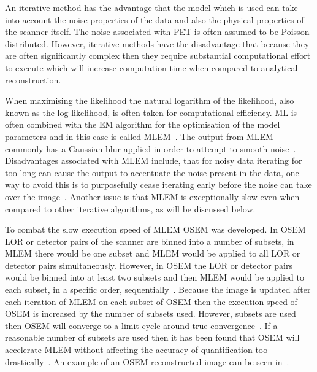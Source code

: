             An iterative method has the advantage that the model which is used can take into account the noise properties of the data and also the physical properties of the scanner itself. The noise associated with \gls{PET} is often assumed to be Poisson distributed. However, iterative methods have the disadvantage that because they are often significantly complex then they require substantial computational effort to execute which will increase computation time when compared to analytical reconstruction.
            
            When maximising the likelihood the natural logarithm of the likelihood, also known as the log-likelihood, is often taken for computational efficiency. \gls{ML} is often combined with the \gls{EM} algorithm for the optimisation of the model parameters and in this case is called \gls{MLEM}~. The output from \gls{MLEM} commonly has a Gaussian blur applied in order to attempt to smooth noise~. Disadvantages associated with \gls{MLEM} include, that for noisy data iterating for too long can cause the output to accentuate the noise present in the data, one way to avoid this is to purposefully cease iterating early before the noise can take over the image~. Another issue is that \gls{MLEM} is exceptionally slow even when compared to other iterative algorithms, as will be discussed below. %
            
            To combat the slow execution speed of \gls{MLEM} \gls{OSEM} was developed. In \gls{OSEM} \gls{LOR} or detector pairs of the scanner are binned into a number of subsets, in \gls{MLEM} there would be one subset and \gls{MLEM} would be applied to all \gls{LOR} or detector pairs simultaneously. However, in \gls{OSEM} the \gls{LOR} or detector pairs would be binned into at least two subsets and then \gls{MLEM} would be applied to each subset, in a specific order, sequentially~. Because the image is updated after each iteration of \gls{MLEM} on each subset of \gls{OSEM} then the execution speed of \gls{OSEM} is increased by the number of subsets used. However, %
            subsets are used %
            then  \gls{OSEM} will converge to a limit cycle around true convergence~. If a reasonable number of subsets are used then it has been found that \gls{OSEM} will accelerate \gls{MLEM} without affecting the accuracy of quantification too drastically~. An example of an \gls{OSEM} reconstructed image can be seen in~.
            

